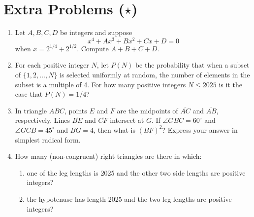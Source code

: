 \documentclass{article}
\begin{document}
\newpage

\section*{Extra Problems ($\star$)}

\begin{enumerate}
\item Let $A,B,C,D$ be integers and suppose
\begin{equation*}
x^4 + Ax^3 + Bx^2 + Cx + D = 0
\end{equation*}
when $x = 2^{1/4} + 2^{1/2}$. Compute $A + B + C + D$.\vspace{3cm}
\item For each positive integer $N$, let $P(N)$ be the probability that when a subset of $\{1, 2, \ldots, N\}$ is selected uniformly at random, the number of elements in the subset is a multiple of 4. For how many positive integers $N\leq 2025$ is it the case that $P(N) = 1/4$?\vspace{3cm}
\item In triangle $ABC$, points $E$ and $F$ are the midpoints of $\overline{AC}$ and $\overline{AB}$, respectively. Lines $\overline{BE}$ and $\overline{CF}$ intersect at $G$. If $\angle GBC = 60^{\circ}$ and $\angle GCB = 45^{\circ}$ and $BG = 4$, then what is $(BF)^2$? Express your answer in simplest radical form.\vspace{3cm}
\item How many (non-congruent) right triangles are there in which:
\begin{enumerate}
\item one of the leg lengths is 2025 and the other two side lengths are positive integers?
\item the hypotenuse has length 2025 and the two leg lengths are positive integers?
\end{enumerate}
\end{enumerate}
\end{document}
